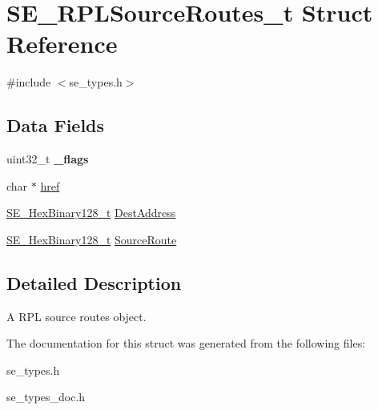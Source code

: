 \hypertarget{structSE__RPLSourceRoutes__t}{}\section{S\+E\+\_\+\+R\+P\+L\+Source\+Routes\+\_\+t Struct Reference}
\label{structSE__RPLSourceRoutes__t}


{\ttfamily \#include $<$se\+\_\+types.\+h$>$}

\subsection*{Data Fields}
\begin{DoxyCompactItemize}
\item 
uint32\+\_\+t {\bfseries \+\_\+flags}
\item 
char $\ast$ \hyperlink{group__RPLSourceRoutes_ga0b07b3df2479ac16c793f7bda884e20b}{href}
\item 
\hyperlink{group__HexBinary128_gae3e6f0afe8ab371017bc37a0831926c5}{S\+E\+\_\+\+Hex\+Binary128\+\_\+t} \hyperlink{group__RPLSourceRoutes_ga740dc3113e13f6f53966619f9ddef8ab}{Dest\+Address}
\item 
\hyperlink{group__HexBinary128_gae3e6f0afe8ab371017bc37a0831926c5}{S\+E\+\_\+\+Hex\+Binary128\+\_\+t} \hyperlink{group__RPLSourceRoutes_ga3443600c5c98ba4bce27431a98a7b6ae}{Source\+Route}
\end{DoxyCompactItemize}


\subsection{Detailed Description}
A R\+PL source routes object. 

The documentation for this struct was generated from the following files\+:\begin{DoxyCompactItemize}
\item 
se\+\_\+types.\+h\item 
se\+\_\+types\+\_\+doc.\+h\end{DoxyCompactItemize}
